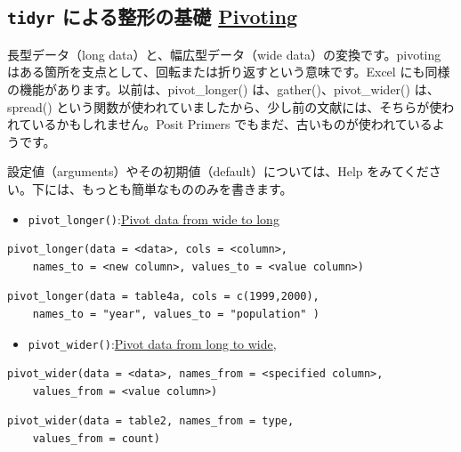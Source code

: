 \documentclass[
  xelatex, ja=standard]{bxjsbook}
\providecommand{\tightlist}{%
  \setlength{\itemsep}{0pt}\setlength{\parskip}{0pt}}
\theoremstyle{definition}
\theoremstyle{definition}
\theoremstyle{definition}
\theoremstyle{definition}
\theoremstyle{remark}
\begin{document}
\hypertarget{tidyr-ux306bux3088ux308bux6574ux5f62ux306eux57faux790e-pivoting}{%
\subsection{\texorpdfstring{\texttt{tidyr} による整形の基礎 \href{https://tidyr.tidyverse.org/articles/pivot.html}{Pivoting}}{tidyr による整形の基礎 Pivoting}}\label{tidyr-ux306bux3088ux308bux6574ux5f62ux306eux57faux790e-pivoting}}

長型データ（long data）と、幅広型データ（wide data）の変換です。pivoting はある箇所を支点として、回転または折り返すという意味です。Excel にも同様の機能があります。以前は、pivot\_longer() は、gather()、pivot\_wider() は、spread() という関数が使われていましたから、少し前の文献には、そちらが使われているかもしれません。Posit Primers でもまだ、古いものが使われているようです。

設定値（arguments）やその初期値（default）については、Help をみてください。下には、もっとも簡単なもののみを書きます。

\begin{itemize}
\tightlist
\item
  \texttt{pivot\_longer()}:\href{https://tidyr.tidyverse.org/reference/pivot_longer.html}{Pivot data from wide to long}
\end{itemize}

\begin{verbatim}
pivot_longer(data = <data>, cols = <column>, 
    names_to = <new column>, values_to = <value column>)
\end{verbatim}

\begin{verbatim}
pivot_longer(data = table4a, cols = c(1999,2000), 
    names_to = "year", values_to = "population" )
\end{verbatim}

\begin{itemize}
\tightlist
\item
  \texttt{pivot\_wider()}:\href{https://tidyr.tidyverse.org/reference/pivot_wider.html}{Pivot data from long to wide},
\end{itemize}

\begin{verbatim}
pivot_wider(data = <data>, names_from = <specified column>, 
    values_from = <value column>)
\end{verbatim}

\begin{verbatim}
pivot_wider(data = table2, names_from = type, 
    values_from = count)
\end{verbatim}
\end{document}
